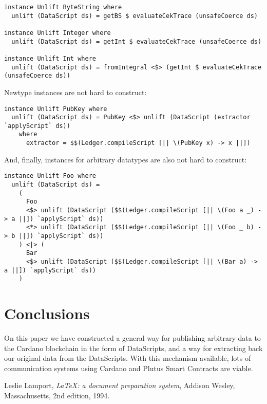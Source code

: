 \documentclass{article}
\begin{document}
\begin{verbatim}
instance Unlift ByteString where
  unlift (DataScript ds) = getBS $ evaluateCekTrace (unsafeCoerce ds)
  
instance Unlift Integer where
  unlift (DataScript ds) = getInt $ evaluateCekTrace (unsafeCoerce ds)

instance Unlift Int where
  unlift (DataScript ds) = fromIntegral <$> (getInt $ evaluateCekTrace (unsafeCoerce ds))
\end{verbatim}

Newtype instances are not hard to construct:

\begin{verbatim}
instance Unlift PubKey where
  unlift (DataScript ds) = PubKey <$> unlift (DataScript (extractor `applyScript` ds))
    where
      extractor = $$(Ledger.compileScript [|| \(PubKey x) -> x ||])
\end{verbatim}

\pagebreak

And, finally, instances for arbitrary datatypes are also not hard to construct:

\begin{verbatim}
instance Unlift Foo where
  unlift (DataScript ds) =
    (
      Foo
      <$> unlift (DataScript ($$(Ledger.compileScript [|| \(Foo a _) -> a ||]) `applyScript` ds))
      <*> unlift (DataScript ($$(Ledger.compileScript [|| \(Foo _ b) -> b ||]) `applyScript` ds))
    ) <|> (
      Bar
      <$> unlift (DataScript ($$(Ledger.compileScript [|| \(Bar a) -> a ||]) `applyScript` ds))
    )
\end{verbatim}

\section{Conclusions}

On this paper we have constructed a general way for publishing arbitrary data to the Cardano blockchain in the form of DataScripts, and a way for extracting back our original data from the DataScripts. With this mechanism available, lots of communication systems using Cardano and Plutus Smart Contracts are viable.

\begin{thebibliography}{9}

  Leslie Lamport,
    \textit{\LaTeX: a document preparation system},
    Addison Wesley, Massachusetts,
    2nd edition,
    1994.

\end{thebibliography}
\end{document}
